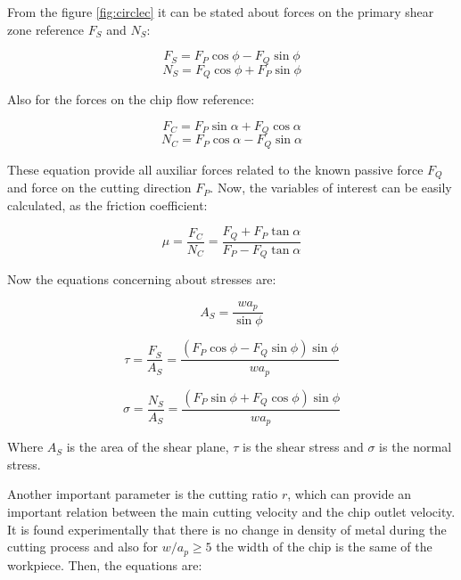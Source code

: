 	From the figure \ref{fig:circlec} it can be stated about forces on the primary shear zone reference $F_{S}$ and $N_{S}$:

	\begin{equation} 
	\label{}
	F_{S} = F_{P}\cos\phi - F_{Q}\sin\phi
	\end{equation}
	\begin{equation} 
	\label{}
	N_{S} = F_{Q}\cos\phi + F_{P}\sin\phi
	\end{equation}

	Also for the forces on the chip flow reference:

	\begin{equation} 
	\label{}
	F_{C} = F_{P}\sin\alpha + F_{Q}\cos\alpha
	\end{equation}
	\begin{equation} 
	\label{}
	N_{C} = F_{P}\cos\alpha - F_{Q}\sin\alpha
	\end{equation}

	These equation provide all auxiliar forces related to the known passive force $F_{Q}$ and force on the cutting direction $F_{P}$. Now, the variables of interest can be easily calculated, as the friction coefficient:

	\begin{equation} 
	\label{eq_friction}
	\mu = \frac{F_{C}}{N_{C}} = \frac{F_{Q} + F_{P}\tan\alpha}{F_{P} - F_{Q}\tan\alpha}
	\end{equation}

	Now the equations concerning about stresses are:

	\begin{equation} 
	\label{}
	A_{S} = \frac{wa_{p}}{\sin\phi}
	\end{equation}

	\begin{equation} 
	\label{}
	\tau = \frac{F_{S}}{A_{S}} = \frac{(F_{P}\cos\phi - F_{Q}\sin\phi)\sin\phi}{wa_{p}}
	\end{equation}

	\begin{equation} 
	\label{}
	\sigma = \frac{N_{S}}{A_{S}} = \frac{(F_{P}\sin\phi + F_{Q}\cos\phi)\sin\phi}{wa_{p}}
	\end{equation}

	Where $A_{S}$ is the area of the shear plane, $\tau$ is the shear stress and $\sigma$ is the normal stress.

	Another important parameter is the cutting ratio $r$, which can provide an important relation between the main cutting velocity and the chip outlet velocity. It is found experimentally that there is no change in density of metal during the cutting process and also for $w/a_{p} \geq 5$ the width of the chip is the same of the workpiece. Then, the equations are:

